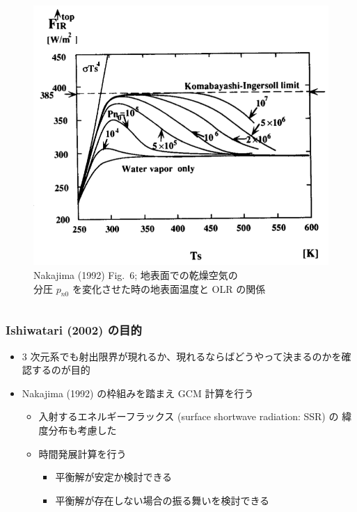 \documentclass[aspectratio=149,9pt,fleqn]{beamer}
\begin{document}
\begin{frame}
\begin{columns}[T,onlytextwidth]
\begin{column}{.4\textwidth}
\begin{figure}
				\scriptsize
				\includegraphics[width=.9\textwidth]{nf6.png}\\
				Nakajima \etal (1992) Fig.\ 6; 地表面での乾燥空気の\\
				分圧 \(p_{n0}\) を変化させた時の地表面温度と OLR の関係
			\end{figure}
		\end{column}
	\end{columns}
\end{frame}

\begin{frame}
	\frametitle{Ishiwatari \etal (2002) の目的}
	\begin{itemize}
		\item 3 次元系でも射出限界が現れるか、現れるならばどうやって決まるのかを確認するのが目的
		\item Nakajima \etal (1992) の枠組みを踏まえ GCM 計算を行う
			\begin{itemize}
				\item 入射するエネルギーフラックス (surface shortwave radiation: SSR) の
					緯度分布も考慮した
				\item 時間発展計算を行う
					\begin{itemize}
						\item 平衡解が安定か検討できる
						\item 平衡解が存在しない場合の振る舞いを検討できる
					\end{itemize}
			\end{itemize}
	\end{itemize}
\end{frame}
\end{document}
